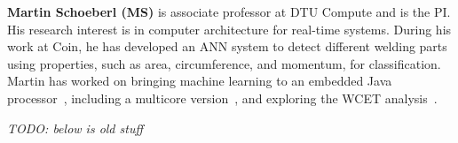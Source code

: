 \documentclass[fleqn,12pt]{article}
\newcommand{\todo}[1]{{\it TODO: #1}}
\begin{document}
  {\bf Martin Schoeberl (MS)} is associate professor at DTU Compute and is the PI.
   His research interest is in computer architecture for real-time systems. During his work at Coin,
   he has developed an ANN system to detect different welding parts using
   properties, such as area, circumference, and momentum, for classification.
   Martin has worked on bringing machine learning to an embedded Java processor~\cite{pedersen:2006-64}, including a multicore
   version~\cite{jop:cmpsvn}, and exploring the WCET analysis~\cite{jop:wcet:spe}.
   
\todo{below is old stuff}
%
\end{document}

